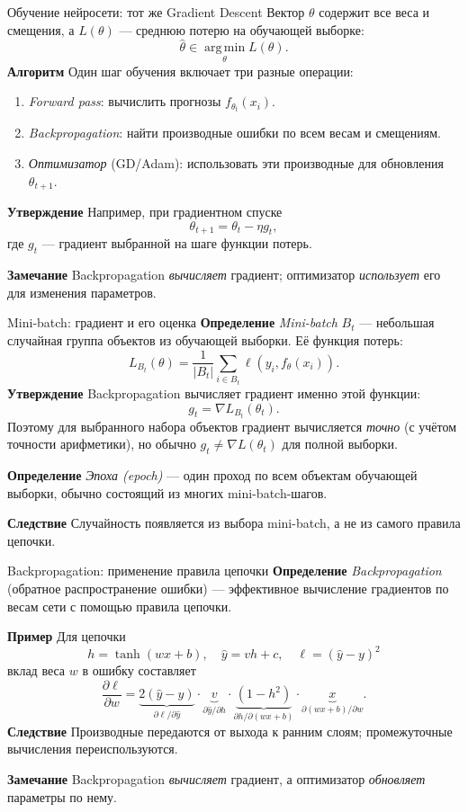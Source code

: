 \documentclass[10pt]{beamer}
\newcommand{\mlBody}{\normalsize}
\newcommand{\mlDefinition}{\textcolor{defblue}{\bfseries Определение}}
\newcommand{\mlStatement}{\textcolor{defblue}{\bfseries Утверждение}}
\newcommand{\mlRemark}{\textcolor{defblue}{\bfseries Замечание}}
\newcommand{\mlConsequence}{\textcolor{defblue}{\bfseries Следствие}}
\newcommand{\mlExample}{\textcolor{defblue}{\bfseries Пример}}
\newcommand{\mlAlgorithm}{\textcolor{defblue}{\bfseries Алгоритм}}
\begin{document}
\begin{frame}{Обучение нейросети: тот же Gradient Descent}
\mlBody
Вектор $\theta$ содержит все веса и смещения, а $L(\theta)$
--- среднюю потерю на обучающей выборке:
\[
 \hat\theta\in\operatorname*{arg\,min}_{\theta}L(\theta).
\]
\mlAlgorithm\; Один шаг обучения включает три разные операции:
\begin{enumerate}
 \item \textit{Forward pass}: вычислить прогнозы $f_{\theta_t}(x_i)$.
 \item \textit{Backpropagation}: найти производные ошибки
 по всем весам и смещениям.
 \item \textit{Оптимизатор} (GD/Adam): использовать эти производные
 для обновления $\theta_{t+1}$.
\end{enumerate}
\mlStatement\; Например, при градиентном спуске
\[
 \boxed{\theta_{t+1}=\theta_t-\eta g_t},
\]
где $g_t$ --- градиент выбранной на шаге функции потерь.

\mlRemark\; Backpropagation \emph{вычисляет} градиент;
оптимизатор \emph{использует} его для изменения параметров.
\end{frame}

\begin{frame}{Mini-batch: градиент и его оценка}
\mlBody
\mlDefinition\; \textit{Mini-batch} $B_t$ --- небольшая случайная группа
объектов из обучающей выборки. Её функция потерь:
\[
 \boxed{L_{B_t}(\theta)=\frac1{|B_t|}\sum_{i\in B_t}
 \ell(y_i,f_\theta(x_i))}.
\]
\mlStatement\; Backpropagation вычисляет градиент именно этой функции:
\[
 \boxed{g_t=\nabla L_{B_t}(\theta_t)}.
\]
Поэтому для выбранного набора объектов градиент вычисляется
\emph{точно} (с учётом точности арифметики), но обычно
$g_t\ne\nabla L(\theta_t)$ для полной выборки.

\mlDefinition\; \textit{Эпоха (epoch)} --- один проход по всем
объектам обучающей выборки, обычно состоящий из многих mini-batch-шагов.

\mlConsequence\; Случайность появляется из выбора mini-batch,
а не из самого правила цепочки.
\end{frame}

\begin{frame}{Backpropagation: применение правила цепочки}
\mlBody
\mlDefinition\; \textit{Backpropagation} (обратное распространение ошибки) --- эффективное вычисление градиентов по весам сети с помощью правила цепочки.

\mlExample\; Для цепочки
\[
 h=\tanh(wx+b),\quad\hat y=vh+c,\quad\ell=(\hat y-y)^2
\]
вклад веса $w$ в ошибку составляет
\[
 \frac{\partial\ell}{\partial w}
 =\underbrace{2(\hat y-y)}_{\partial\ell/\partial\hat y}
 \cdot\underbrace{v}_{\partial\hat y/\partial h}
 \cdot\underbrace{(1-h^2)}_{\partial h/\partial(wx+b)}
 \cdot\underbrace{x}_{\partial(wx+b)/\partial w}.
\]
\mlConsequence\; Производные передаются от выхода к ранним слоям; промежуточные вычисления переиспользуются.

\mlRemark\; Backpropagation \emph{вычисляет} градиент, а оптимизатор \emph{обновляет} параметры по нему.
\end{frame}
\end{document}
